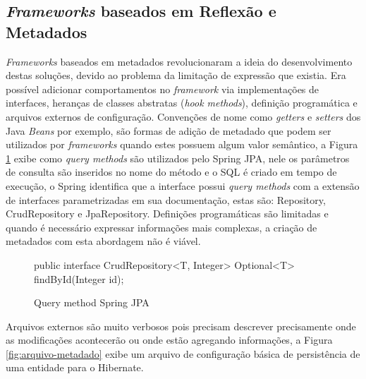 \subsection{\textit{Frameworks} baseados em Reflexão e Metadados}

\par \textit{Frameworks} baseados em metadados revolucionaram a ideia do desenvolvimento destas soluções, devido ao problema da limitação de expressão que existia. Era possível adicionar comportamentos no \textit{framework} via implementações de interfaces, heranças de classes abstratas (\textit{hook methods}), definição programática e arquivos externos de configuração. Convenções de nome como \textit{getters} e \textit{setters} dos Java \textit{Beans} por exemplo, são formas de adição de metadado que podem ser utilizados por \textit{frameworks} quando estes possuem algum valor semântico, a Figura \ref{fig:spring-qyery-method} exibe como \textit{query methods} são utilizados pelo Spring JPA, nele os parâmetros de consulta são inseridos no nome do método e o SQL é criado em tempo de execução, o Spring identifica que a interface possui \textit{query methods} com a extensão de interfaces parametrizadas em sua documentação, estas são: Repository, CrudRepository e JpaRepository. Definições programáticas são limitadas e quando é necessário expressar informações mais complexas, a criação de metadados com esta abordagem não é viável.

\begin{figure}[H]
    \centering
    \caption{Query method Spring JPA}
    \begin{java}
public interface CrudRepository<T, Integer> {
    Optional<T> findById(Integer id);
}
    \end{java}
    \label{fig:spring-qyery-method}
\end{figure}

Arquivos externos são muito verbosos pois precisam descrever precisamente onde as modificações acontecerão ou onde estão agregando informações, a Figura \ref{fig:arquivo-metadado} exibe um arquivo de configuração básica de persistência de uma entidade para o Hibernate.

